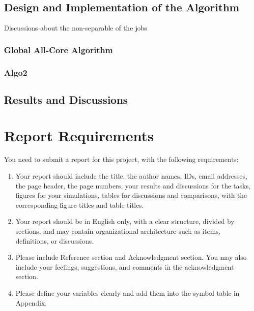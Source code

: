 \documentclass{llncs}
\begin{document}
\subsection{Design and Implementation of the Algorithm}\label{subsec-algo2}
Discussions about the non-separable of the jobs
\subsubsection{Global All-Core Algorithm}

\subsubsection{Algo2}

\subsection{Results and Discussions}\label{subsec-result2}

\section{Report Requirements}

You need to submit a report for this project, with the following requirements:

\begin{enumerate}
  \item Your report should include the title, the author names, IDs, email addresses, the page header, the page numbers, your results and discussions for the tasks, figures for your simulations, tables for discussions and comparisons, with the corresponding figure titles and table titles.

  \item Your report should be in English only, with a clear structure, divided by sections, and may contain organizational architecture such as items, definitions, or discussions.

  \item Please include Reference section and Acknowledgment section. You may also include your feelings, suggestions, and comments in the acknowledgment section.

  \item Please define your variables clearly and add them into the symbol table in Appendix.

\end{enumerate}
\end{document}

